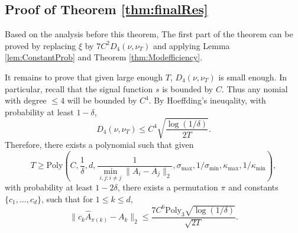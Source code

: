 \subsection{Proof of Theorem \ref{thm:finalRes}}
Based on the analysis before this theorem, The first part of the theorem can be proved by replacing $\xi$ by $7C^2D_4(\nu,\nu_T)$ and applying Lemma \ref{lem:ConstantProb} and Theorem \ref{thm:Modefficiency}. 

It remains to prove that given large enough $T$, $D_4(\nu, \nu_T)$ is small enough. 
In particular, recall that the signal function $s$ is bounded by $C$. 
Thus any nomial with degree $\le 4$ will be bounded by $C^4$.
By Hoeffding's ineuqality, with probability at least $1-\delta$, 
\[
D_4(\nu, \nu_T) \le  C^4\sqrt{\frac{\log(1/\delta)}{2T}}.
\]
Therefore, there exists a polynomial such that given 
\[
T \ge \text{Poly}\left(C, \frac{1}{\delta}, d, \frac{1}{\min_{i,j:i\neq j}\|A_i - A_j\|_2}, \sigma_{\max}, 1/\sigma_{\min}, \kappa_{\max}, 1/\kappa_{\min}\right),
\]
with probability at least $1-2\delta$, there exists a permutation $\pi$ and constants $\{c_1,\ldots,c_d\}$, such that for $1\le k\le d$,
\[
\| c_k\widehat{A}_{\pi(k)} - A_k\|_2 \le \frac{7C^6\text{Poly}_3\sqrt{\log(1/\delta)}}{\sqrt{2T}}.
\]
